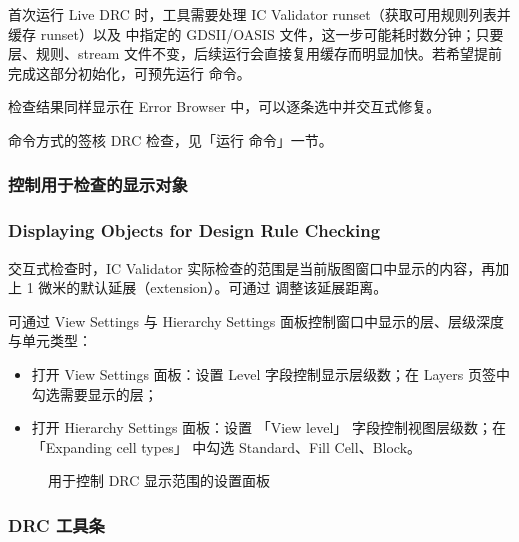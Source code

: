 首次运行 Live DRC 时，工具需要处理 IC Validator runset（获取可用规则列表并缓存 runset）以及  中指定的 GDSII/OASIS 文件，这一步可能耗时数分钟；只要层、规则、stream 文件不变，后续运行会直接复用缓存而明显加快。若希望提前完成这部分初始化，可预先运行  命令。

检查结果同样显示在 Error Browser 中，可以逐条选中并交互式修复。

\begin{seeAlsoBox}
命令方式的签核 DRC 检查，见「运行  命令」一节。
\end{seeAlsoBox}

\subsubsection{控制用于检查的显示对象}
\subsubsection*{Displaying Objects for Design Rule Checking}

交互式检查时，IC Validator 实际检查的范围是当前版图窗口中显示的内容，再加上 1 微米的默认延展（extension）。可通过  调整该延展距离。

可通过 View Settings 与 Hierarchy Settings 面板控制窗口中显示的层、层级深度与单元类型：
\begin{itemize}
  \item 打开 View Settings 面板：设置 Level 字段控制显示层级数；在 Layers 页签中勾选需要显示的层；
  \item 打开 Hierarchy Settings 面板：设置 「View level」 字段控制视图层级数；在 「Expanding cell types」 中勾选 Standard、Fill Cell、Block。
\end{itemize}

\begin{figure}[htbp]
\centering
{}
\caption{用于控制 DRC 显示范围的设置面板}
\label{fig:drc-display-settings}
\end{figure}

\subsubsection{DRC 工具条}
